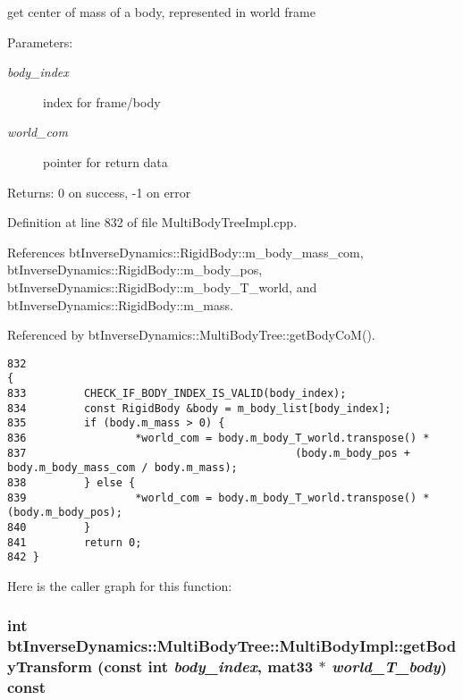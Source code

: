 get center of mass of a body, represented in world frame \begin{Desc}
\item[Parameters:]
\begin{description}
\item[{\em body\_\-index}]index for frame/body \item[{\em world\_\-com}]pointer for return data \end{description}
\end{Desc}
\begin{Desc}
\item[Returns:]0 on success, -1 on error \end{Desc}
 

Definition at line 832 of file MultiBodyTreeImpl.cpp.

References btInverseDynamics::RigidBody::m\_\-body\_\-mass\_\-com, btInverseDynamics::RigidBody::m\_\-body\_\-pos, btInverseDynamics::RigidBody::m\_\-body\_\-T\_\-world, and btInverseDynamics::RigidBody::m\_\-mass.

Referenced by btInverseDynamics::MultiBodyTree::getBodyCoM().

\begin{Code}\begin{verbatim}832                                                                                 {
833         CHECK_IF_BODY_INDEX_IS_VALID(body_index);
834         const RigidBody &body = m_body_list[body_index];
835         if (body.m_mass > 0) {
836                 *world_com = body.m_body_T_world.transpose() *
837                                          (body.m_body_pos + body.m_body_mass_com / body.m_mass);
838         } else {
839                 *world_com = body.m_body_T_world.transpose() * (body.m_body_pos);
840         }
841         return 0;
842 }
\end{verbatim}
\end{Code}




Here is the caller graph for this function:\hypertarget{classbt_inverse_dynamics_1_1_multi_body_tree_1_1_multi_body_impl_2ed9b926162aaf1eacf4f85190b014c7}{
\subsubsection[getBodyTransform]{\setlength{\rightskip}{0pt plus 5cm}int btInverseDynamics::MultiBodyTree::MultiBodyImpl::getBodyTransform (const int {\em body\_\-index}, \/  mat33 $\ast$ {\em world\_\-T\_\-body}) const}}
\label{classbt_inverse_dynamics_1_1_multi_body_tree_1_1_multi_body_impl_2ed9b926162aaf1eacf4f85190b014c7}


